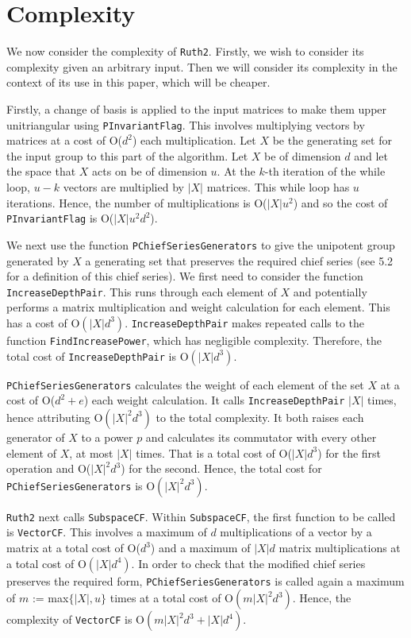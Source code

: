 \documentclass[12pt]{report}
\begin{document}
\section{Complexity}

We now consider the complexity of {\tt Ruth2}. Firstly, we wish to consider its complexity given an arbitrary input. Then we will consider its complexity in the context of its use in this paper, which will be cheaper.

Firstly, a change of basis is applied to the input matrices to make them upper unitriangular using {\tt PInvariantFlag}. This involves multiplying vectors by matrices at a cost of O($d^2$) each multiplication. Let $X$ be the generating set for the input group to this part of the algorithm. Let $X$ be of dimension $d$ and let the space that $X$ acts on be of dimension $u$. At the $k$-th iteration of the while loop, $u - k$ vectors are multiplied by $|X|$ matrices. This while loop has $u$ iterations. Hence, the number of multiplications is O($|X| u^2$) and so the cost of {\tt PInvariantFlag} is O($|X| u^2 d^2$).

We next use the function {\tt PChiefSeriesGenerators} to give the unipotent group generated by $X$ a generating set that preserves the required chief series (see 5.2 for a definition of this chief series). We first need to consider the function {\tt IncreaseDepthPair}. This runs through each element of $X$ and potentially performs a matrix multiplication and weight calculation for each element. This has a cost of O$(|X|d^3)$. {\tt IncreaseDepthPair} makes repeated calls to the function {\tt FindIncreasePower}, which has negligible complexity. Therefore, the total cost of {\tt IncreaseDepthPair} is O$(|X|d^3)$.

{\tt PChiefSeriesGenerators} calculates the weight of each element of the set $X$ at a cost of O($d^2 + e$) each weight calculation. It calls {\tt IncreaseDepthPair} $|X|$ times, hence attributing O$(|X|^2 d^3)$ to the total complexity. It both raises each generator of $X$ to a power $p$ and calculates its commutator with every other element of $X$, at most $|X|$ times. That is a total cost of O($|X| d^3$) for the first operation and O($|X|^2 d^3$) for the second. Hence, the total cost for {\tt PChiefSeriesGenerators} is O$(|X|^2 d^3)$.

{\tt Ruth2} next calls {\tt SubspaceCF}. Within {\tt SubspaceCF}, the first function to be called is {\tt VectorCF}. This involves a maximum of $d$ multiplications of a vector by a matrix at a total cost of O($d^3$) and a maximum of $|X|d$ matrix multiplications at a total cost of O$(|X| d^4)$. In order to check that the modified chief series preserves the required form, {\tt PChiefSeriesGenerators} is called again a maximum of $m$ := max$\{|X|, u\}$ times at a total cost of O$(m |X|^2 d^3)$. Hence, the complexity of {\tt VectorCF} is O$(m |X|^2 d^3 + |X| d^4)$.
\end{document}
